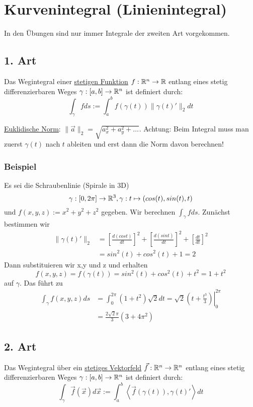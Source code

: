 \section{Kurvenintegral (Linienintegral)}
In den Übungen sind nur immer Integrale der zweiten Art vorgekommen. 
\subsection{1. Art}
Das Wegintegral einer \underline{stetigen Funktion} $f: \mathbb{R}^n \to \mathbb{R}$ entlang
eines stetig differenzierbaren Weges $\gamma: [a,b] \to \mathbb{R}^n$ ist definiert durch:
\[
\int_\gamma f ds := \int_a^b f(\gamma(t)) \|\gamma(t)'\|_2 dt
\]

\underline{Euklidische Norm}: $\|\vec{a}\|_2 = \sqrt{a_x^2 + a_y^2 + \ldots}$.
Achtung: Beim Integral muss man zuerst $\gamma(t)$ nach $t$ ableiten und erst
dann die Norm davon berechnen!

\subsubsection{Beispiel}
Es sei die Schraubenlinie (Spirale in 3D)
\[
\gamma : [0,2\pi]  \to \mathbb{R}^3, \gamma : t \mapsto  (cos(t), sin(t), t) 
\]
und $f(x,y,z) := x^2 + y^2 + z^2$ gegeben. Wir berechnen $\int_\gamma f ds$. Zunächst bestimmen wir
\begin{align*}
\|\gamma(t)'\|_2 &= \left[\frac{d(cos t)}{dt}\right]^2 + \left[\frac{d(sin t)}{dt}\right]^2 + \left[\frac{dt}{dt}\right]^2 \\
&=  sin^2(t)+cos^2(t)+1=2
\end{align*}
Dann substituieren wir x,y und z und erhalten
\[
f(x,y,z) = f(\gamma(t)) = sin^2(t)+cos^2(t)+t^2 = 1 +t^2
\]
auf $\gamma$. Das führt zu
\begin{align*}
\int_\gamma f(x,y,z) ds &= \int_0^{2\pi} (1 +t^2)\sqrt{2} dt = \left. \sqrt{2}(t+\frac{t^3}{3}) \right|_0^{2\pi} \\
&= \frac{2\sqrt{2}\pi}{3}(3+4\pi^2)
\end{align*}


\subsection{2. Art}
Das Wegintegral über ein \underline{stetiges Vektorfeld} $\vec{f}: \mathbb{R}^n \to \mathbb{R}^n$
entlang eines stetig differenzierbaren Weges $\gamma: [a,b] \to \mathbb{R}^n$ ist definiert
durch:
\[
\int_\gamma \vec{f}(\vec{x}) d\vec{x} := \int_a^b \left< \vec{f}(\gamma(t)), \gamma(t)' \right> dt
\]

